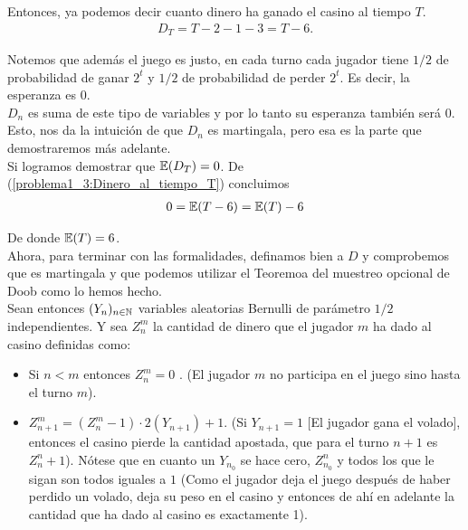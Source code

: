 	Entonces, ya podemos decir cuanto dinero ha ganado el casino al tiempo $T$.
	\begin{align}\label{problema1_3:Dinero_al_tiempo_T}
		D_T = T-2 - 1 - 3 = T - 6. 
	\end{align}					   
   
	Notemos que además el juego es justo, en cada turno cada jugador tiene $1/2$ de probabilidad de
	ganar $2^t$ y $1/2$ de probabilidad de perder $2^t$. Es decir, la esperanza es $0$.\\
	
	$D_n$ es suma de este tipo de variables y por lo tanto su esperanza también será $0$.\\
   
	Esto, nos da la intuición de que $D_n$ es martingala, pero esa es la parte que demostraremos más adelante.\\
   
	Si logramos demostrar que $\mathbb{E}(D_T) = 0$. De (\ref{problema1_3:Dinero_al_tiempo_T}) concluimos
	\begin{align}
		0 = \mathbb{E}(T - 6) = \mathbb{E}(T) - 6
	\end{align}
	
	De donde $\mathbb{E}(T) = 6$.\\
	
	Ahora, para terminar con las formalidades, definamos bien a $D$ y comprobemos que es martingala y 
	que podemos utilizar el Teoremoa del muestreo opcional de Doob como lo hemos hecho.\\
	
	Sean entonces $(Y_n)_{n \in \mathbb{N}}$ variables aleatorias Bernulli de parámetro $1/2$ independientes.
	Y sea $Z_n^m$ la cantidad de dinero que el jugador $m$ ha dado al casino definidas como:
	
	\begin{itemize}
		\item 
			Si $n < m$ entonces $Z_n^m = 0$ . (El jugador $m$ no participa en el juego sino hasta el turno $m$).
		\item
			$Z_{n+1}^{m} = (Z_n^{m} - 1) \cdot 2(Y_{n+1}) + 1$. (Si $Y_{n + 1} = 1$ [El jugador gana el volado], entonces el casino
			pierde la cantidad apostada, que para el turno $n+1$ es $Z_n^n + 1$). Nótese que en cuanto un $Y_{n_0}$ se hace cero,
			$Z_{n_0}^{n}$ y todos los que le sigan son todos iguales a $1$ (Como el jugador deja el juego después de haber perdido
			un volado, deja su peso en el casino y entonces de ahí en adelante la cantidad que ha dado al casino es exactamente 1).
	\end{itemize}
	
